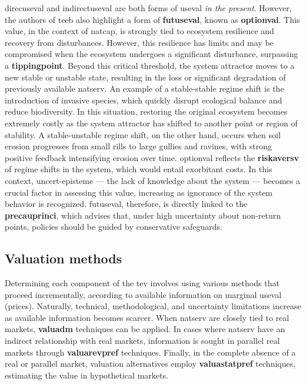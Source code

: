 \documentclass[./main_en.tex]{subfiles}
\begin{document}
\par \gls{direcuseval} and \gls{indirectuseval} are both forms of \gls{useval} \textit{in the present}. However, the authors of \acrshort{teeb} also highlight a form of \textbf{\gls{futuseval}}, known as \textbf{\gls{optionval}}. This value, in the context of \gls{natcap}, is strongly tied to ecosystem resilience and recovery from disturbances. However, this resilience has limits and may be compromised when the ecosystem undergoes a significant disturbance, surpassing a \textbf{\gls{tippingpoint}}. Beyond this critical threshold, the \gls{system} attractor moves to a new stable or unstable state, resulting in the loss or significant degradation of previously available \gls{natserv}. An example of a stable-stable regime shift is the introduction of invasive species, which quickly disrupt ecological balance and reduce biodiversity. In this situation, restoring the original ecosystem becomes extremely costly as the \gls{system} attractor has shifted to another point or region of stability. A stable-unstable regime shift, on the other hand, occurs when soil erosion progresses from small rills to large gullies and ravines, with strong positive feedback intensifying erosion over time. \gls{optionval} reflects the \textbf{\gls{riskaversv}} of regime shifts in the \gls{system}, which would entail exorbitant costs. In this context, \gls{uncert-episteme} — the lack of knowledge about the \gls{system} — becomes a crucial factor in assessing this value, increasing as ignorance of the \gls{system} behavior is recognized. \gls{futuseval}, therefore, is directly linked to the \textbf{\gls{precauprinci}}, which advises that, under high uncertainty about non-return points, policies should be guided by conservative safeguards.

\subsection{Valuation methods} \label{sec:natserv:valuemethos}

\par Determining each component of the \gls{tev} involves using various methods that proceed incrementally, according to available information on marginal \gls{useval} (prices). Naturally, technical, methodological, and uncertainty limitations increase as available information becomes scarcer. When \gls{natserv} are closely tied to real markets, \textbf{\gls{valuadm}} techniques can be applied. In cases where \gls{natserv} have an indirect relationship with real markets, information is sought in parallel real markets through \textbf{\gls{valuarevpref}} techniques. Finally, in the complete absence of a real or parallel market, valuation alternatives employ \textbf{\gls{valuastatpref}} techniques, estimating the value in hypothetical markets.
\end{document}
